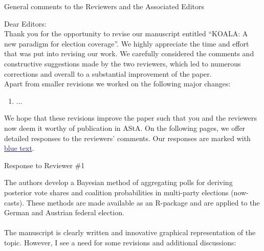 \documentclass{scrartcl}
\newcommand{\blue}[1]{\textcolor{MidnightBlue}{\underline{\textcolor{MidnightBlue}{#1}}}}
\begin{document}
\begin{center}
\large General comments to the Reviewers and the Associated Editors
\end{center}

\vspace{5ex}

Dear Editors:
\\[2ex]
Thank you for the opportunity to revise our manuscript entitled ``KOALA: A new paradigm for election coverage''. We highly appreciate the time and effort that was put into revising our work. We carefully considered the comments and constructive suggestions made by the two reviewers, which led to numerous corrections and overall to a substantial improvement of the paper.
\\[3ex]

Apart from smaller revisions we worked on the following major changes:
\begin{enumerate}
  \item ...
\end{enumerate}

\vspace{4ex}

We hope that these revisions improve the paper such that you and the reviewers now deem it worthy of publication in AStA. On the following pages, we offer detailed responses to the reviewers' comments. Our responses are marked with \blue{blue text}.


\pagebreak
\begin{center}
\large Response to Reviewer \#1
\end{center}
\vspace{5ex}

The authors develop a Bayesian method of aggregating polls for deriving posterior vote shares and coalition probabilities in multi-party elections (now-casts). These methods are made available as an R-package and are applied to the German and Austrian federal election.
\\ \\
The manuscript is clearly written and innovative graphical representation of the topic. However, I see a need for some revisions and additional discussions:
\end{document}
